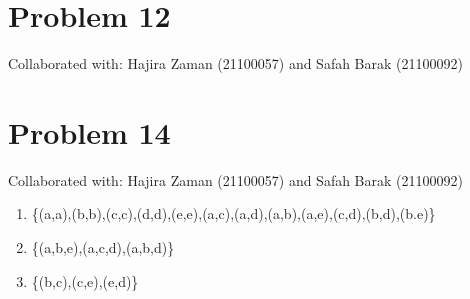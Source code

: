 \documentclass{article}
\begin{document}
\section{Problem 12}
Collaborated with: Hajira Zaman (21100057) and Safah Barak (21100092)\\
\section{Problem 14}
Collaborated with: Hajira Zaman (21100057) and Safah Barak (21100092)
\begin{enumerate}
\item %
\{(a,a),(b,b),(c,c),(d,d),(e,e),(a,c),(a,d),(a,b),(a,e),(c,d),(b,d),(b.e)\}

\item %
\{(a,b,e),(a,c,d),(a,b,d)\}

\item %

\{(b,c),(c,e),(e,d)\}
\end{enumerate}
\end{document}
